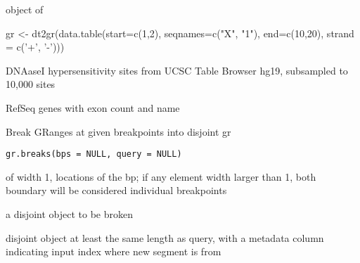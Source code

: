 \documentclass[a4paper]{book}
\begin{document}
%
\begin{Value}
 object of 
\end{Value}
%
\begin{Examples}
\begin{ExampleCode}
gr <- dt2gr(data.table(start=c(1,2), seqnames=c("X", "1"), end=c(10,20), strand = c('+', '-')))
\end{ExampleCode}
\end{Examples}
%
\begin{Description}\relax
DNAaseI hypersensitivity sites from UCSC Table Browser hg19,
subsampled to 10,000 sites
\end{Description}
%
\begin{Format}
\end{Format}
%
\begin{Description}\relax
RefSeq genes with exon count and name
\end{Description}
%
\begin{Format}
\end{Format}
%
\begin{Description}\relax
Break GRanges at given breakpoints into disjoint gr
\end{Description}
%
\begin{Usage}
\begin{verbatim}
gr.breaks(bps = NULL, query = NULL)
\end{verbatim}
\end{Usage}
%
\begin{Arguments}
\begin{ldescription}
\item[\code{bps}]  of width 1, locations of the bp; if any element width
larger than 1, both boundary will be considered individual breakpoints

\item[\code{query}] a disjoint  object to be broken
\end{ldescription}
\end{Arguments}
%
\begin{Value}
 disjoint object at least the same length as query,
with a metadata column  indicating input index where new segment is from
\end{Value}
\end{document}
